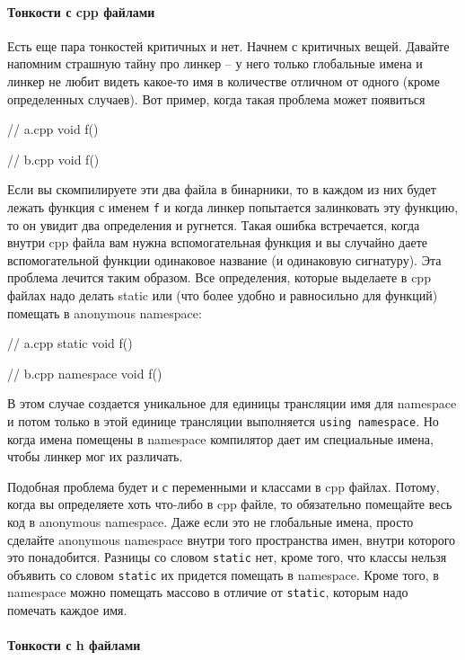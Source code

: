 \paragraph{Тонкости с cpp файлами}

Есть еще пара тонкостей критичных и нет.
Начнем с критичных вещей.
Давайте напомним страшную тайну про линкер -- у него только глобальные имена и линкер не любит видеть какое-то имя в количестве отличном от одного (кроме определенных случаев).
Вот пример, когда такая проблема может появиться
\begin{cppcode}
// a.cpp
void f() {}

// b.cpp
void f() {}
\end{cppcode}
Если вы скомпилируете эти два файла в бинарники, то в каждом из них будет лежать функция с именем \verb"f" и когда линкер попытается залинковать эту функцию, то он увидит два определения и ругнется.
Такая ошибка встречается, когда внутри cpp файла вам нужна вспомогательная функция и вы случайно даете вспомогательной функции одинаковое название (и одинаковую сигнатуру).
Эта проблема лечится таким образом.
Все определения, которые выделаете в cpp файлах надо делать static или (что более удобно и равносильно для функций) помещать в anonymous namespace:
\begin{cppcode}
// a.cpp
static void f() {}

// b.cpp
namespace {
void f() {}
}
\end{cppcode}
В этом случае создается уникальное для единицы трансляции имя для namespace и потом только в этой единице трансляции выполняется \verb"using namespace".
Но когда имена помещены в namespace компилятор дает им специальные имена, чтобы линкер мог их различать.

Подобная проблема будет и с переменными и классами в cpp файлах.
Потому, когда вы определяете хоть что-либо в cpp файле, то обязательно помещайте весь код в anonymous namespace.
Даже если это не глобальные имена, просто сделайте anonymous namespace внутри того пространства имен, внутри которого это понадобится.
Разницы со словом \verb"static" нет, кроме того, что классы нельзя объявить со словом \verb"static" их придется помещать в namespace.
Кроме того, в namespace можно помещать массово в отличие от \verb"static", которым надо помечать каждое имя.

\paragraph{Тонкости с h файлами}

